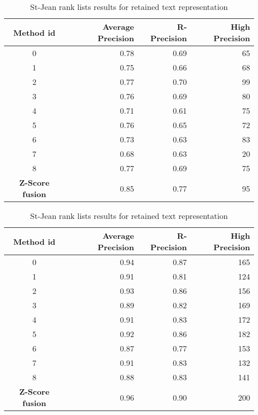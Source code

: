 \begin{table}[H]
  \centering
  \caption{St-Jean rank lists results for retained text representation}
  \label{tab:9rl_results_st_jean}

  \begin{tabular}{c r r r}
    \toprule
    Method id &
    Average Precision &
    R-Precision &
    High Precision \\
    \midrule
    0 & 0.78 & 0.69 & 65 \\
    1 & 0.75 & 0.66 & 68 \\
    2 & 0.77 & 0.70 & 99 \\
    3 & 0.76 & 0.69 & 80 \\
    4 & 0.71 & 0.61 & 75 \\
    5 & 0.76 & 0.65 & 72 \\
    6 & 0.73 & 0.63 & 83 \\
    7 & 0.68 & 0.63 & 20 \\
    8 & 0.77 & 0.69 & 75 \\
    \textbf{Z-Score fusion} & 0.85 & 0.77 & 95 \\
    \bottomrule
  \end{tabular}

  \vspace{0.5cm}

  \label{tab:9rl_results_st_jean_B}
  \begin{tabular}{c r r r}
    \toprule
    Method id &
    Average Precision &
    R-Precision &
    High Precision \\
    \midrule
    0 & 0.94 & 0.87 & 165 \\
    1 & 0.91 & 0.81 & 124 \\
    2 & 0.93 & 0.86 & 156 \\
    3 & 0.89 & 0.82 & 169 \\
    4 & 0.91 & 0.83 & 172 \\
    5 & 0.92 & 0.86 & 182 \\
    6 & 0.87 & 0.77 & 153 \\
    7 & 0.91 & 0.83 & 132 \\
    8 & 0.88 & 0.83 & 141 \\
    \textbf{Z-Score fusion} & 0.96 & 0.90 & 200 \\
    \bottomrule
  \end{tabular}

  \vspace{0.5cm}


\end{table}
